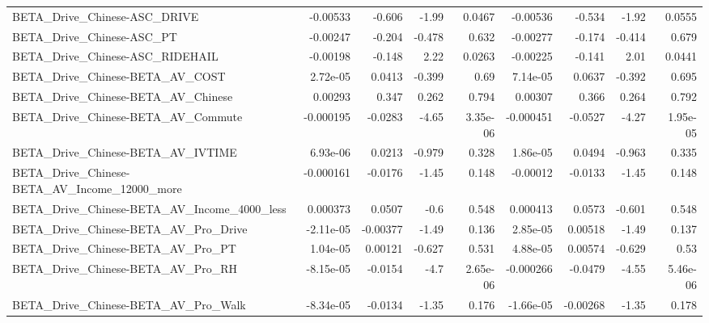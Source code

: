 \begin{tabular}{lrrrrrrrr}
BETA\_Drive\_Chinese-ASC\_DRIVE                       &    -0.00533 &       -0.606 &     -1.99 &   0.0467 &   -0.00536 &      -0.534 &        -1.92 &        0.0555 \\
BETA\_Drive\_Chinese-ASC\_PT                          &    -0.00247 &       -0.204 &    -0.478 &    0.632 &   -0.00277 &      -0.174 &       -0.414 &         0.679 \\
BETA\_Drive\_Chinese-ASC\_RIDEHAIL                    &    -0.00198 &       -0.148 &      2.22 &   0.0263 &   -0.00225 &      -0.141 &         2.01 &        0.0441 \\
BETA\_Drive\_Chinese-BETA\_AV\_COST                    &    2.72e-05 &       0.0413 &    -0.399 &     0.69 &   7.14e-05 &      0.0637 &       -0.392 &         0.695 \\
BETA\_Drive\_Chinese-BETA\_AV\_Chinese                 &     0.00293 &        0.347 &     0.262 &    0.794 &    0.00307 &       0.366 &        0.264 &         0.792 \\
BETA\_Drive\_Chinese-BETA\_AV\_Commute                 &   -0.000195 &      -0.0283 &     -4.65 & 3.35e-06 &  -0.000451 &     -0.0527 &        -4.27 &      1.95e-05 \\
BETA\_Drive\_Chinese-BETA\_AV\_IVTIME                  &    6.93e-06 &       0.0213 &    -0.979 &    0.328 &   1.86e-05 &      0.0494 &       -0.963 &         0.335 \\
BETA\_Drive\_Chinese-BETA\_AV\_Income\_12000\_more       &   -0.000161 &      -0.0176 &     -1.45 &    0.148 &   -0.00012 &     -0.0133 &        -1.45 &         0.148 \\
BETA\_Drive\_Chinese-BETA\_AV\_Income\_4000\_less        &    0.000373 &       0.0507 &      -0.6 &    0.548 &   0.000413 &      0.0573 &       -0.601 &         0.548 \\
BETA\_Drive\_Chinese-BETA\_AV\_Pro\_Drive               &   -2.11e-05 &     -0.00377 &     -1.49 &    0.136 &   2.85e-05 &     0.00518 &        -1.49 &         0.137 \\
BETA\_Drive\_Chinese-BETA\_AV\_Pro\_PT                  &    1.04e-05 &      0.00121 &    -0.627 &    0.531 &   4.88e-05 &     0.00574 &       -0.629 &          0.53 \\
BETA\_Drive\_Chinese-BETA\_AV\_Pro\_RH                  &   -8.15e-05 &      -0.0154 &      -4.7 & 2.65e-06 &  -0.000266 &     -0.0479 &        -4.55 &      5.46e-06 \\
BETA\_Drive\_Chinese-BETA\_AV\_Pro\_Walk                &   -8.34e-05 &      -0.0134 &     -1.35 &    0.176 &  -1.66e-05 &    -0.00268 &        -1.35 &         0.178 \\

\end{tabular}
